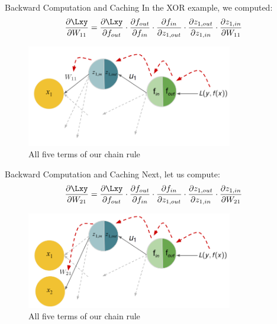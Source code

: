 \begin{frame} {Backward Computation and Caching}
    In the XOR example, we computed:
    $$\frac{\partial \Lxy}{\partial W_{11}} = 
        \frac{\partial \Lxy}{\partial f_{out}} \cdot  \textcolor{black}{\frac{\partial f_{out}}{\partial f_{in}}} \cdot  \textcolor{black}{\frac{\partial f_{in}}{\partial z_{1,out}}} \cdot  \textcolor{black}{\frac{\partial z_{1,out}}{\partial z_{1,in}}} \cdot  \textcolor{black}{\frac{\partial z_{1,in}}{\partial W_{11}}} $$
  \begin{figure}
    \centering
      \includegraphics[width=9cm]{plots/backprop_gg1_new.png}
      \caption{All five terms of our chain rule}
  \end{figure}
\end{frame}
\begin{frame} {Backward Computation and Caching}
      Next, let us compute:
      $$\frac{\partial \Lxy}{\partial W_{21}} = 
        \frac{\partial \Lxy}{\partial f_{out}} \cdot  \textcolor{black}{\frac{\partial f_{out}}{\partial f_{in}}} \cdot  \textcolor{black}{\frac{\partial f_{in}}{\partial z_{1,out}}} \cdot  \textcolor{black}{\frac{\partial z_{1,out}}{\partial z_{1,in}}} \cdot  \textcolor{black}{\frac{\partial z_{1,in}}{\partial W_{21}}}$$
        \begin{figure}
    \centering
      \includegraphics[width=9cm]{plots/backprop_gg_new.png}
      \caption{All five terms of our chain rule}
  \end{figure}
\end{frame}
